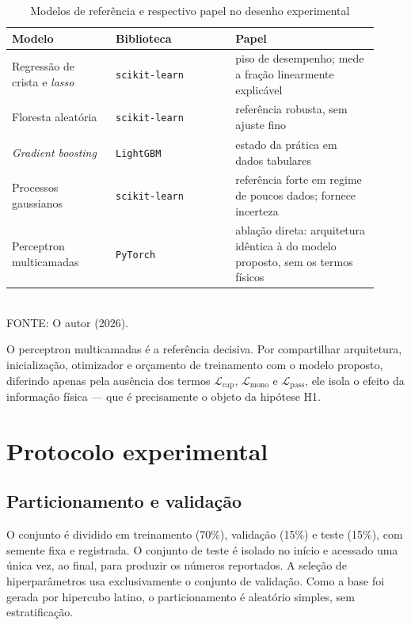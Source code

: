 \begin{table}[htb]
\centering
\caption{Modelos de referência e respectivo papel no desenho experimental}
\label{tab:baselines}
\footnotesize
\begin{tabular}{@{}p{0.26\linewidth}p{0.30\linewidth}p{0.36\linewidth}@{}}
\toprule
\textbf{Modelo} & \textbf{Biblioteca} & \textbf{Papel} \\
\midrule
Regressão de crista e \textit{lasso} & \texttt{scikit-learn} & piso de
desempenho; mede a fração linearmente explicável \\[0.3em]
Floresta aleatória & \texttt{scikit-learn} & referência robusta, sem ajuste fino
\\[0.3em]
\textit{Gradient boosting} & \texttt{LightGBM} & estado da prática em dados
tabulares \\[0.3em]
Processos gaussianos & \texttt{scikit-learn} & referência forte em regime de
poucos dados; fornece incerteza \\[0.3em]
Perceptron multicamadas & \texttt{PyTorch} & ablação direta: arquitetura idêntica
à do modelo proposto, sem os termos físicos \\
\bottomrule
\end{tabular}
\vspace{0.3em}
\\{\footnotesize FONTE: O autor (2026).}
\end{table}

O perceptron multicamadas é a referência decisiva. Por compartilhar arquitetura,
inicialização, otimizador e orçamento de treinamento com o modelo proposto,
diferindo apenas pela ausência dos termos $\mathcal{L}_{\text{cap}}$,
$\mathcal{L}_{\text{mono}}$ e $\mathcal{L}_{\text{pass}}$, ele isola o efeito da
informação física — que é precisamente o objeto da hipótese H1.

\section{Protocolo experimental}
\label{sec:protocolo}

\subsection{Particionamento e validação}

O conjunto é dividido em treinamento (70\%), validação (15\%) e teste (15\%), com
semente fixa e registrada. O conjunto de teste é isolado no início e acessado uma
única vez, ao final, para produzir os números reportados. A seleção de
hiperparâmetros usa exclusivamente o conjunto de validação. Como a base foi
gerada por hipercubo latino, o particionamento é aleatório simples, sem
estratificação.

